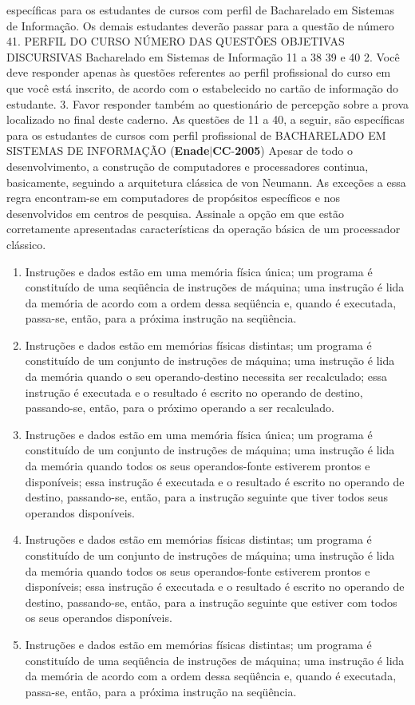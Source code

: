 \documentclass{exam}
\begin{document}
\begin{questions}
específicas para os estudantes de cursos com perfil de Bacharelado em Sistemas de
Informação. Os demais estudantes deverão passar para a questão de número 41.
PERFIL DO CURSO
NÚMERO DAS QUESTÕES
OBJETIVAS DISCURSIVAS
Bacharelado em Sistemas de Informação 11 a 38 39 e 40
2. Você deve responder apenas às questões referentes ao perfil profissional do curso em que
você está inscrito, de acordo com o estabelecido no cartão de informação do estudante.
3. Favor responder também ao questionário de percepção sobre a prova localizado no final
deste caderno.
As questões de 11 a 40, a seguir, são específicas para os estudantes de cursos com perfil profissional de
BACHARELADO EM SISTEMAS DE INFORMAÇÃO
\question (\textbf{Enade}$|$\textbf{CC}-\textbf{2005}) Apesar de todo o desenvolvimento, a construção de computadores
e processadores continua, basicamente, seguindo a arquitetura
clássica de von Neumann. As exceções a essa regra encontram-se
em computadores de propósitos específicos e nos desenvolvidos
em centros de pesquisa. Assinale a opção em que estão
corretamente apresentadas características da operação básica de
um processador clássico.
	\begin{enumerate}[label=\alph*)]
		\item  Instruções e dados estão em uma memória física única; um
programa é constituído de uma seqüência de instruções de
máquina; uma instrução é lida da memória de acordo com a
ordem dessa seqüência e, quando é executada, passa-se, então,
para a próxima instrução na seqüência.
		\item  Instruções e dados estão em memórias físicas distintas; um
programa é constituído de um conjunto de instruções de
máquina; uma instrução é lida da memória quando o seu
operando-destino necessita ser recalculado; essa instrução é
executada e o resultado é escrito no operando de destino,
passando-se, então, para o próximo operando a ser recalculado.
		\item  Instruções e dados estão em uma memória física única; um
programa é constituído de um conjunto de instruções de
máquina; uma instrução é lida da memória quando todos os
seus operandos-fonte estiverem prontos e disponíveis; essa
instrução é executada e o resultado é escrito no operando de
destino, passando-se, então, para a instrução seguinte que tiver
todos seus operandos disponíveis.
		\item  Instruções e dados estão em memórias físicas distintas; um
programa é constituído de um conjunto de instruções de
máquina; uma instrução é lida da memória quando todos os
seus operandos-fonte estiverem prontos e disponíveis; essa
instrução é executada e o resultado é escrito no operando de
destino, passando-se, então, para a instrução seguinte que
estiver com todos os seus operandos disponíveis.
		\item  Instruções e dados estão em memórias físicas distintas; um
programa é constituído de uma seqüência de instruções de
máquina; uma instrução é lida da memória de acordo com a
ordem dessa seqüência e, quando é executada, passa-se, então,
para a próxima instrução na seqüência.


\end{enumerate}
\end{questions}
\end{document}
